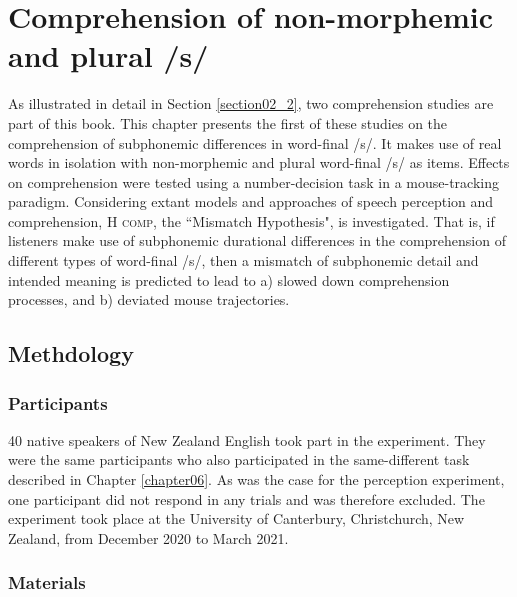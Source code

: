 \chapter{Comprehension of non-morphemic and plural /s/}\label{chapter07}

As illustrated in detail in Section \ref{section02_2}, two comprehension studies are part of this book. This chapter presents the first of these studies on the comprehension of subphonemic differences in word-final /s/. It makes use of real words in isolation with non-morphemic and plural word-final /s/ as items. Effects on comprehension were tested using a number-decision task in a mouse-tracking paradigm. Considering extant models and approaches of speech perception and comprehension, \textsc{H comp}, the ``Mismatch Hypothesis", is investigated. That is, if listeners make use of subphonemic durational differences in the comprehension of different types of word-final /s/, then a mismatch of subphonemic detail and intended meaning is predicted to lead to a) slowed down comprehension processes, and b) deviated mouse trajectories. 

\section{Methdology}\label{section07_1}

\subsection{Participants}\label{section07_1_1}

40 native speakers of New Zealand English took part in the experiment. They were the same participants who also participated in the same-different task described in Chapter \ref{chapter06}. As was the case for the perception experiment, one participant did not respond in any trials and was therefore excluded. The experiment took place at the University of Canterbury, Christchurch, New Zealand, from December 2020 to March 2021.

\subsection{Materials}\label{section07_1_2}

